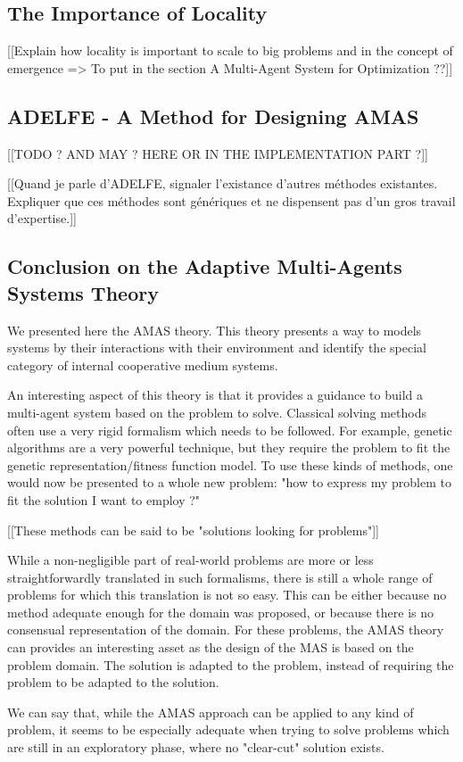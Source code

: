 \subsection{The Importance of Locality}
[[Explain how locality is important to scale to big problems and in the concept of emergence => To put in the section A Multi-Agent System for Optimization ??]]

\subsection{ADELFE - A Method for Designing AMAS} 
[[TODO ? AND MAY ? HERE OR IN THE IMPLEMENTATION PART ?]]

[[Quand je parle d'ADELFE, signaler l'existance d'autres méthodes existantes. Expliquer que ces méthodes sont génériques et ne dispensent pas d'un gros travail d'expertise.]]

\subsection{Conclusion on the Adaptive Multi-Agents Systems Theory}

We presented here the AMAS theory. This theory presents a way to models systems by their interactions with their environment and identify the special category of internal cooperative medium systems.

An interesting aspect of this theory  is that it provides a guidance to build a multi-agent system based on the problem to solve. Classical solving methods often use a very rigid formalism which needs to be followed. For example, genetic algorithms are a very powerful technique, but they require the problem to fit the genetic representation/fitness function model. To use these kinds of methods, one would now be presented to a whole new problem: "how to express my problem to fit the solution I want to employ ?"

[[These methods can be said to be "solutions looking for problems"]]

While a non-negligible part of real-world problems are more or less straightforwardly translated in such formalisms, there is still a whole range of problems for which this translation is not so easy. This can be either because no method adequate enough for the domain was proposed, or because there is no consensual representation of the domain. For these problems, the AMAS theory can provides an interesting asset as the design of the MAS is based on the problem domain. The solution is adapted to the problem, instead of requiring the problem to be adapted to the solution.

We can say that, while the AMAS approach can be applied to any kind of problem, it seems to be especially adequate when trying to solve problems which are still in an exploratory phase, where no "clear-cut" solution exists.


